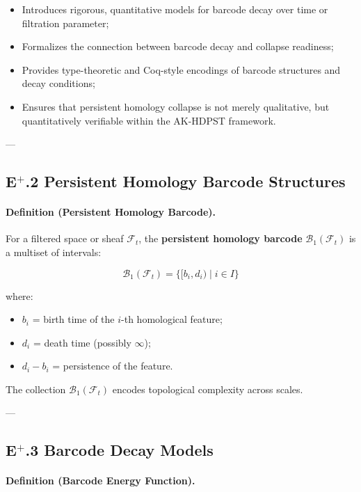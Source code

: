 \documentclass[11pt]{article}
\begin{document}
\begin{itemize}
    \item Introduces rigorous, quantitative models for barcode decay over time or filtration parameter;
    \item Formalizes the connection between barcode decay and collapse readiness;
    \item Provides type-theoretic and Coq-style encodings of barcode structures and decay conditions;
    \item Ensures that persistent homology collapse is not merely qualitative, but quantitatively verifiable within the AK-HDPST framework.
\end{itemize}

---

\subsection*{E$^{+}$.2 Persistent Homology Barcode Structures}

\paragraph{Definition (Persistent Homology Barcode).}

For a filtered space or sheaf $\mathcal{F}_t$, the \textbf{persistent homology barcode} $\mathcal{B}_1(\mathcal{F}_t)$ is a multiset of intervals:

\[
\mathcal{B}_1(\mathcal{F}_t) = \{ [b_i, d_i) \mid i \in I \}
\]

where:

\begin{itemize}
    \item $b_i$ = birth time of the $i$-th homological feature;
    \item $d_i$ = death time (possibly $\infty$);
    \item $d_i - b_i$ = persistence of the feature.
\end{itemize}

The collection $\mathcal{B}_1(\mathcal{F}_t)$ encodes topological complexity across scales.

---

\subsection*{E$^{+}$.3 Barcode Decay Models}

\paragraph{Definition (Barcode Energy Function).}
\end{document}
